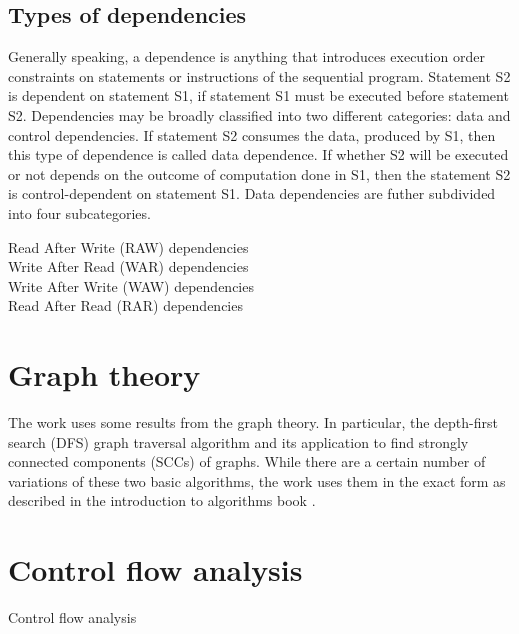 \subsection{Types of dependencies} \label{background-dependence}
\qquad Generally speaking, a dependence is anything that introduces execution order constraints on statements or instructions of the sequential program. Statement S2 is dependent on statement S1, if statement S1 must be executed before statement S2. Dependencies may be broadly classified into two different categories: data and control dependencies. If statement S2 consumes the data, produced by S1, then this type of dependence is called data dependence. If whether S2 will be executed or not depends on the outcome of computation done in S1, then the statement S2 is control-dependent on statement S1. \newline  
\null\qquad Data dependencies are futher subdivided into four subcategories.

\begin{description}
\item [Read After Write (RAW) dependencies]  
\item [Write After Read (WAR) dependencies]    
\item [Write After Write (WAW) dependencies] 
\item [Read After Read (RAR) dependencies] 
\end{description}

\section{Graph theory} \label{background-graph-theory}
\qquad The work uses some results from the graph theory. In particular, the depth-first search (DFS) graph traversal algorithm and its application to find strongly connected components (SCCs) of graphs. While there are a certain number of variations of these two basic algorithms, the work uses them in the exact form as described in the introduction to algorithms book \cite{introduction-to-algorithms-book}.

\section{Control flow analysis} \label{background-control-flow-analysis}
\qquad Control flow analysis \cite{advanced-compiler-design-book}

